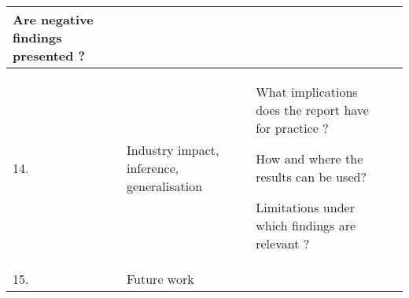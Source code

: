 \begin{table}[h!]
{\begin{tabular}{|>{\raggedright}p{}|>{\raggedright}p{}|>{\raggedright}p{}|>{\raggedright}p{}|}
Are negative findings presented \citep{Kitchenham2007}? & \tabularnewline
\hline 
14. & Industry impact, inference, generalisation & What implications does the report have for practice \citep{Kitchenham2007}?

How and where the results can be used?

Limitations under which findings are relevant \citep{Jedlitschka2005}? & \tabularnewline
\hline 
15. & Future work &  & \tabularnewline
\hline

\end{tabular}
} %
\end{table}